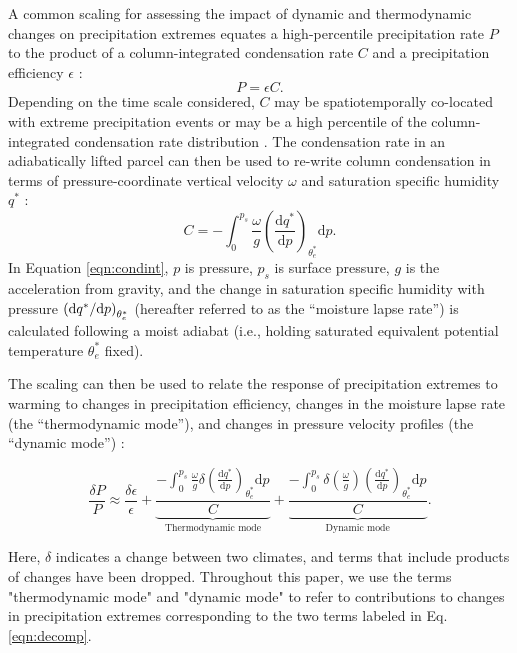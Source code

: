 \documentclass[twocol]{ametsoc}
\begin{document}
A common scaling for assessing the impact of dynamic and thermodynamic changes on precipitation extremes equates a high-percentile precipitation rate $P$ to the product of a column-integrated condensation rate $C$ and a precipitation efficiency $\epsilon$ \citep{OGorman2009TheChange,Muller2011IntensificationModel}:
\begin{equation}
    P = \epsilon C.
\end{equation}
Depending on the time scale considered, $C$ may be spatiotemporally co-located with extreme precipitation events \citep[as in][]{Muller2011IntensificationModel,Fildier2017SimultaneousChange} or may be a high percentile of the column-integrated condensation rate distribution \citep[as in][]{Singh2014TheTemperature}. The condensation rate in an adiabatically lifted parcel can then be used to re-write column condensation in terms of pressure-coordinate vertical velocity $\omega$ and saturation specific humidity $q^*$ \citep{OGorman2009TheChange}:
\begin{equation} \label{eqn:condint}
    C = -\int_{0}^{p_s} \frac{\omega}{g} \left(\frac{\mathrm{d}q^*}{\mathrm{d}p} \right)_{\theta_e^*} \mathrm{d}{p}.
\end{equation}
In Equation \ref{eqn:condint}, $p$ is pressure, $p_s$ is surface pressure, $g$ is the acceleration from gravity, and the change in saturation specific humidity with pressure $\left({\rm d}q^*/{\rm d}p\right)_{\theta_e^*}$ (hereafter referred to as the ``moisture lapse rate'') is calculated following a moist adiabat (i.e., holding saturated equivalent potential temperature $\theta_e^*$ fixed). 

The scaling can then be used to relate the response of precipitation extremes to warming to changes in precipitation efficiency, changes in the moisture lapse rate (the ``thermodynamic mode''), and changes in pressure velocity profiles (the ``dynamic mode'') \citep{Muller2011IntensificationModel}:
\begin{strip}
\begin{equation}
    \frac{\delta P}{P} \approx \frac{\delta \epsilon}{\epsilon} + \underbrace{\frac{-\int_{0}^{p_s} \frac{\omega}{g} \delta \left(\frac{\mathrm{d}q^*}{\mathrm{d}p} \right)_{\theta_e^*} \mathrm{d}{p}}{C}}_\text{Thermodynamic mode} + \underbrace{\frac{-\int_{0}^{p_s} \delta \left ( \frac{\omega}{g} \right) \left(\frac{\mathrm{d}q^*}{\mathrm{d}p} \right)_{\theta_e^*} \mathrm{d}{p}}{C}}_\text{Dynamic mode}.
\label{eqn:decomp}
\end{equation}
\end{strip}
Here, $\delta$ indicates a change between two climates, and terms that include products of changes have been dropped. Throughout this paper, we use the terms "thermodynamic mode" and "dynamic mode" to refer to contributions to changes in precipitation extremes corresponding to the two terms labeled in Eq. \ref{eqn:decomp}.
\end{document}
